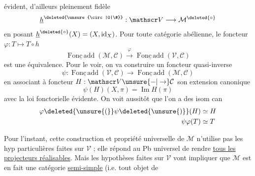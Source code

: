 évident, d'ailleurs pleinement fidèle
\[
 \underline h^{\deleted{\unsure{\circ|0|\#}}}:\mathscr V\longrightarrow\mathcal M^{\deleted{\circ}}
\]
en posant $\underline h^{\deleted{\circ}}(X)=(X,\mathrm{id}_X)$. Pour toute catégorie abélienne,
le foncteur $\varphi:T\mapsto T\circ h$
\[
 \underline{\operatorname{Fonc\,add}}(\mathcal M,\mathcal C)\xrightarrow{\varphi}\underline{\operatorname{Fonc\,add}}(\mathscr V,\mathcal C)
\]
est une  équivalence. Pour le voir, on va construire un foncteur quasi-inverse 
\[
 \psi:\underline{\operatorname{Fonc\,add}}(\mathscr V,\mathcal C)\longrightarrow\underline{\operatorname{Fonc\,add}}(\mathcal M,\mathcal C)
\]
en associant à  foncteur $H:\mathscr V\unsure{\mathord{-}|\to}\mathcal C$ son extension canonique
\[
 \psi(H)(X,\pi)=\operatorname{Im}H(\pi)
\]
avec la loi fonctorielle évidente. On voit aussitôt que l'on a des isom can
\[
\begin{aligned}
 \varphi\deleted{\unsure{(}}\psi\deleted{\unsure{)}}(H)&\simeq H\\
 \psi\varphi(T)&\simeq T
\end{aligned}
\]

Pour l'instant, cette construction et propriété universelle de $\mathcal M$ n'utilise pas les hyp particulières faites sur $\mathscr V$ ; elle répond au Pb universel de rendre \uline{tous les projecteurs réalisables}. Mais les hypothèses faites sur $\mathscr V$ vont impliquer que $\mathcal M$ est en fait une catégorie  \uline{semi-simple} (i.e. tout objet de
